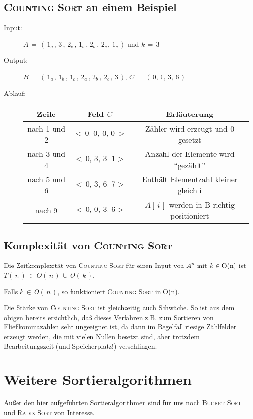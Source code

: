   \subsection{\textsc{Counting Sort} an einem Beispiel}

  \begin{description}
    \item[Input:] $A\,=\,(\,1_a\,,\,3\,,\,2_a\,,\,1_b\,,\,2_b\,,\,2_c\,,\,1_c\,)$ und $k\,=\,3$
    \item[Output:] $B\,=\,(\,1_a\,,\,1_b\,,\,1_c\,,\,2_a\,,\,2_b\,,\,2_c\,,\,3\,)$, $C\,=\,(\,0,\,0,\,3,\,6\,)$
    \item[Ablauf:]
    \begin{tabular}[t]{*{3}{c}}
      Zeile & Feld $C$ & Erläuterung\\
      \hline
      nach 1 und 2 & $<\,0,\,0,\,0,\,0\,>$ & Zähler wird erzeugt und 0 gesetzt\\
      nach 3 und 4 & $<\,0,\,3,\,3,\,1>$   & Anzahl der Elemente wird ``gezählt''\\
      nach 5 und 6 & $<\,0,\,3,\,6,\,7>$   & Enthält Elementzahl kleiner gleich i\\
      nach 9       & $<\,0,\,0,\,3,\,6>$   & $A[\,i\,]$ werden in B richtig positioniert\\
    \end{tabular}
    
    
  \end{description}

  \subsection{Komplexität von \textsc{Counting Sort}}
   Die Zeitkomplexität von \textsc{Counting Sort} für einen Input von $A^n$ mit 
   \(k \in \textup{O}(\textup{n})\) ist 
   \\ $T(\,n\,)\, \in \,O(\,n\,)\,\cup\,O(\,k\,)$.
  \begin{satz}
   Falls $k\,\in \,O(\,n\,)$, so funktioniert \textsc{Counting Sort} in O(n).
  \end{satz}

Die Stärke von \textsc{Counting Sort} ist gleichzeitig auch Schwäche. So ist aus dem obigen bereits ersichtlich, daß dieses Verfahren
z.B. zum Sortieren von Fließkommazahlen sehr ungeeignet ist, da dann im Regelfall riesige Zählfelder erzeugt werden, die mit vielen
Nullen besetzt sind, aber trotzdem Bearbeitungszeit (und Speicherplatz!) verschlingen.

\section{Weitere Sortieralgorithmen}
  Außer den hier aufgeführten Sortieralgorithmen sind für uns noch \textsc{Bucket Sort} und
  \textsc{Radix Sort} von Interesse.

